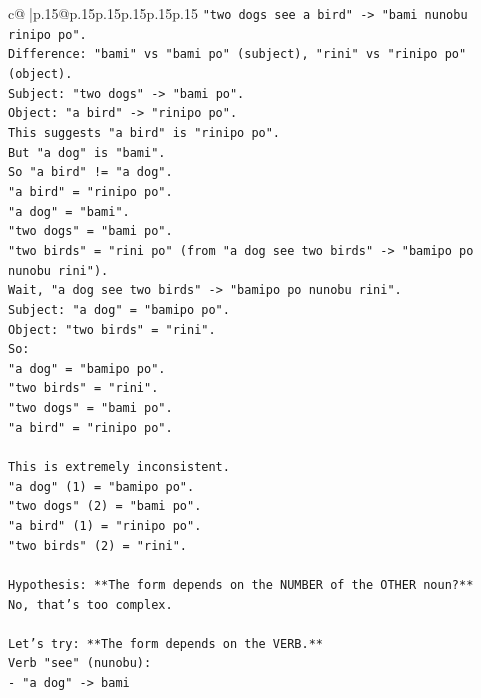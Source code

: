 \documentclass{article}
\begin{document}
{\begin{supertabular}{c@{$\;$}|p{.15\linewidth}@{}p{.15\linewidth}p{.15\linewidth}p{.15\linewidth}p{.15\linewidth}p{.15\linewidth}}
{{{\texttt{"two dogs see a bird" {-}> "bami nunobu rinipo po".} \\
\texttt{Difference: "bami" vs "bami po" (subject), "rini" vs "rinipo po" (object).} \\
\texttt{Subject: "two dogs" {-}> "bami po".} \\
\texttt{Object: "a bird" {-}> "rinipo po".} \\
\texttt{This suggests "a bird" is "rinipo po".} \\
\texttt{But "a dog" is "bami".} \\
\texttt{So "a bird" != "a dog".} \\
\texttt{"a bird" = "rinipo po".} \\
\texttt{"a dog" = "bami".} \\
\texttt{"two dogs" = "bami po".} \\
\texttt{"two birds" = "rini po" (from "a dog see two birds" {-}> "bamipo po nunobu rini").} \\
\texttt{Wait, "a dog see two birds" {-}> "bamipo po nunobu rini".} \\
\texttt{Subject: "a dog" = "bamipo po".} \\
\texttt{Object: "two birds" = "rini".} \\
\texttt{So:} \\
\texttt{"a dog" = "bamipo po".} \\
\texttt{"two birds" = "rini".} \\
\texttt{"two dogs" = "bami po".} \\
\texttt{"a bird" = "rinipo po".} \\
\\ 
\texttt{This is extremely inconsistent.} \\
\texttt{"a dog" (1) = "bamipo po".} \\
\texttt{"two dogs" (2) = "bami po".} \\
\texttt{"a bird" (1) = "rinipo po".} \\
\texttt{"two birds" (2) = "rini".} \\
\\ 
\texttt{Hypothesis: **The form depends on the NUMBER of the OTHER noun?**} \\
\texttt{No, that's too complex.} \\
\\ 
\texttt{Let's try: **The form depends on the VERB.**} \\
\texttt{Verb "see" (nunobu):} \\
\texttt{{-} "a dog" {-}> bami} \\
}}}
\end{supertabular}}
\end{document}
